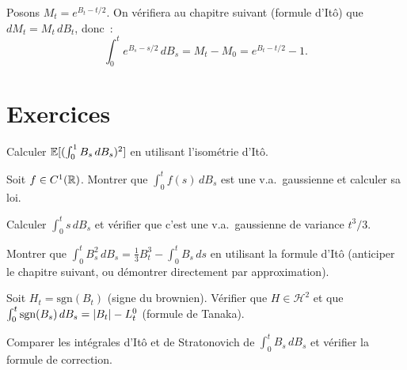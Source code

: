 \begin{exemple}[$\int_0^t e^{B_s - s/2} \, dB_s$]
Posons $M_t = e^{B_t - t/2}$. On v\'erifiera au chapitre suivant (formule d'It\^o)
que $dM_t = M_t \, dB_t$, donc~:
\[
  \int_0^t e^{B_s - s/2} \, dB_s = M_t - M_0 = e^{B_t - t/2} - 1.
\]
\end{exemple}

\section{Exercices}

\begin{exercice}
Calculer $\mathbb{E}[(\int_0^1 B_s \, dB_s)^2]$ en utilisant l'isom\'etrie d'It\^o.
\end{exercice}

\begin{exercice}
Soit $f \in C^1(\mathbb{R})$. Montrer que $\int_0^t f(s) \, dB_s$ est une v.a.\ gaussienne
et calculer sa loi.
\end{exercice}

\begin{exercice}
Calculer $\int_0^t s \, dB_s$ et v\'erifier que c'est une v.a.\ gaussienne de
variance $t^3/3$.
\end{exercice}

\begin{exercice}
Montrer que $\int_0^t B_s^2 \, dB_s = \frac{1}{3} B_t^3 - \int_0^t B_s \, ds$
en utilisant la formule d'It\^o (anticiper le chapitre suivant, ou d\'emontrer
directement par approximation).
\end{exercice}

\begin{exercice}
Soit $H_t = \text{sgn}(B_t)$ (signe du brownien). V\'erifier que $H \in \mathcal{H}^2$
et que $\int_0^t \text{sgn}(B_s) \, dB_s = \left| B_t \right| - L_t^0$
(formule de Tanaka).
\end{exercice}

\begin{exercice}
Comparer les int\'egrales d'It\^o et de Stratonovich de $\int_0^t B_s \, dB_s$
et v\'erifier la formule de correction.
\end{exercice}
